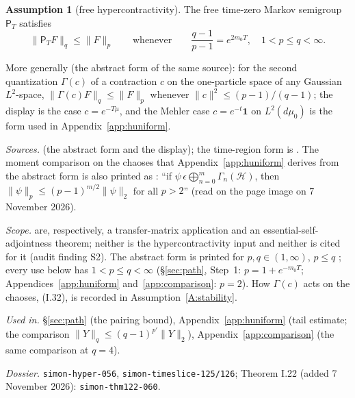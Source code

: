\documentclass[11pt,a4paper]{article}
\theoremstyle{plain}
\theoremstyle{definition}
\newtheorem{assumption}{Assumption}
\theoremstyle{plain}
\theoremstyle{definition}
\begin{document}
\begin{assumption}[free hypercontractivity]\label{A:hyper}
The free time-zero Markov semigroup $\mathsf P_T$ satisfies
\[
 \|\mathsf P_TF\|_{q}\le\|F\|_{p}
 \qquad\text{whenever}\qquad \frac{q-1}{p-1}=e^{2m_0T},\quad 1<p\le q<\infty .
\]

More generally (the abstract form of the same source): for the second quantization
$\Gamma(c)$ of a contraction $c$ on the one-particle space of any Gaussian $L^2$-space,
$\|\Gamma(c)F\|_{q}\le\|F\|_{p}$ whenever $\|c\|^2\le(p-1)/(q-1)$; the display is the
case $c=e^{-T\mu}$, and the Mehler case $c=e^{-t}\mathbf 1$ on $L^2(d\mu_0)$ is the form
used in Appendix~\ref{app:huniform}.

\emph{Sources.} \cite[Thm.~I.17]{SimonBook} (the abstract form and the display); the
time-region form is \cite[Thm.~III.17]{SimonBook}.  The moment comparison on the chaoses
that Appendix~\ref{app:huniform} derives from the abstract form is also printed as
\cite[Thm.~I.22, (I.47), p.~38]{SimonBook}: ``if $\psi\,\epsilon\bigoplus_{n=0}^m
\Gamma_n(\mathcal H)$, then $\|\psi\|_p\le(p-1)^{m/2}\|\psi\|_2$ for all $p>2$'' (read on
the page image on 7 November 2026).

\emph{Scope.} \cite[Thms.~V.10, V.12]{SimonBook} are, respectively, a transfer-matrix %
application and an essential-self-adjointness theorem; neither is the hypercontractivity input
and neither is cited for it (audit finding S2).  The abstract form is printed for
$p,q\in(1,\infty)$, $p\le q$ \cite[Thm.~I.17, p.~34]{SimonBook}; every use below has
$1<p\le q<\infty$ (\S\ref{sec:path}, Step~1: $p=1+e^{-m_0T}$; Appendices~\ref{app:huniform}
and~\ref{app:comparison}: $p=2$).  How $\Gamma(c)$ acts on the chaoses, (I.32), is recorded in
Assumption~\ref{A:stability}.

\emph{Used in.} \S\ref{sec:path} (the pairing bound), Appendix~\ref{app:huniform} (tail
estimate; the comparison $\|Y\|_q\le(q-1)^{p'}\|Y\|_2$), Appendix~\ref{app:comparison}
(the same comparison at $q=4$).

{\raggedright\emph{Dossier.} \texttt{simon-hyper-056}, \texttt{simon-timeslice-125/126};
Theorem I.22 (added 7 November 2026): \texttt{simon-thm122-060}.\par}
\end{assumption}
\end{document}

